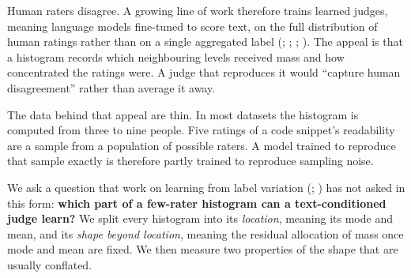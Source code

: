 \documentclass{article}
\begin{document}
Human raters disagree. A growing line of work therefore trains learned judges, meaning language models fine-tuned to score text, on the full distribution of human ratings rather than on a single aggregated label (\citealp{chen2025beyond}; \citealp{singh2025distributions}; \citealp{kohli2026metric}; \citealp{benitosantos2025beyond}). The appeal is that a histogram records which neighbouring levels received mass and how concentrated the ratings were. A judge that reproduces it would ``capture human disagreement'' rather than average it away.

The data behind that appeal are thin. In most datasets the histogram is computed from three to nine people. Five ratings of a code snippet's readability are a sample from a population of possible raters. A model trained to reproduce that sample exactly is therefore partly trained to reproduce sampling noise.

We ask a question that work on learning from label variation (\citealp{uma2021learning}; \citealp{plank2022problem}) has not asked in this form: \textbf{which part of a few-rater histogram can a text-conditioned judge learn?} We split every histogram into its \emph{location}, meaning its mode and mean, and its \emph{shape beyond location}, meaning the residual allocation of mass once mode and mean are fixed. We then measure two properties of the shape that are usually conflated.
\end{document}
